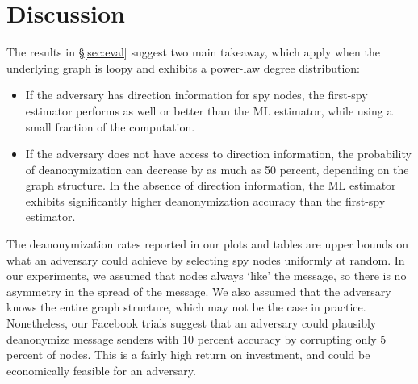 \section{Discussion}

The results in \S\ref{sec:eval} suggest two main takeaway, which apply when the underlying graph is loopy and exhibits a power-law degree distribution:
\begin{itemize}
\item If the adversary has direction information for spy nodes, the first-spy estimator performs as well or better than the ML estimator, while using a small fraction of the computation.
\item If the adversary does not have access to direction information, the probability of deanonymization can decrease by as much as 50 percent, depending on the graph structure. In the absence of direction information, the ML estimator exhibits significantly higher deanonymization accuracy than the first-spy estimator.
\end{itemize} 

%

%

The deanonymization rates reported in our plots and tables are upper bounds on what an adversary could achieve by selecting spy nodes uniformly at random. In our experiments, we assumed that nodes always `like' the message, so there is no asymmetry in the spread of the message. We also assumed that the adversary knows the entire graph structure, which may not be the case in practice. Nonetheless, our Facebook trials suggest that an adversary could plausibly deanonymize message senders with 10 percent accuracy by corrupting only 5 percent of nodes. This is a fairly high return on investment, and could be economically feasible for an adversary. 

